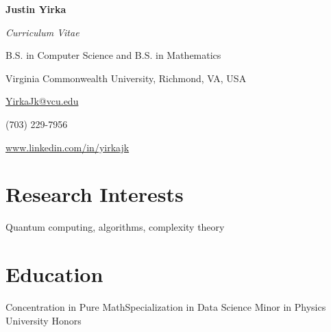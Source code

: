 \documentclass[11pt,letterpaper]{moderncv}
\begin{document}
\begin{center}
	{\Large\textbf{Justin Yirka}}
	
	\textit{Curriculum Vitae}
	
	B.S. in Computer Science and B.S. in Mathematics
	
	Virginia Commonwealth University, Richmond, VA, USA
	\vspace{\baselineskip}
	
	\href{mailto:yirkajk@vcu.edu}{YirkaJk@vcu.edu}
	
	(703) 229-7956
	
	\url{www.linkedin.com/in/yirkajk}	
\end{center}


\setlength{\parskip}{0.5em} 


\section{Research Interests}
Quantum computing, algorithms, complexity theory


\section{Education}
\vspace{-\baselineskip}\vspace{-\parskip}
{	
	\begin{adjustwidth}{.25in}{}
		Concentration in Pure Math\hspace{2em}Specialization in Data Science \newline
		Minor in Physics \newline
		University Honors
	\end{adjustwidth}
}


\end{document}
